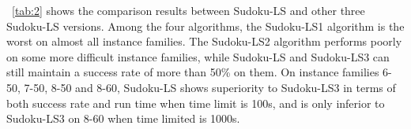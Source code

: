 \documentclass{article}
\begin{document}
\tablename~\ref{tab:2} shows the comparison results between Sudoku-LS and other three Sudoku-LS versions. Among the four algorithms, the Sudoku-LS1 algorithm is the worst on almost all instance families. The Sudoku-LS2 algorithm performs poorly on some more difficult instance families, while Sudoku-LS and Sudoku-LS3 can still maintain a success rate of more than 50\% on them. On instance families 6-50, 7-50, 8-50 and 8-60, Sudoku-LS shows superiority to Sudoku-LS3 in terms of both success rate and run time when time limit is 100s, and is only inferior to Sudoku-LS3 on 8-60 when time limited is 1000s. 

\begin{table}[t]
    \centering
\end{table}
\end{document}
